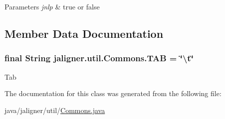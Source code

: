 \begin{DoxyParams}{Parameters}
{\em jnlp} & true or false \\
\hline
\end{DoxyParams}


\subsection{Member Data Documentation}
\hypertarget{classjaligner_1_1util_1_1_commons_a2df8b17be1dbabf911eddbe8a155e5eb}{
\subsubsection[{T\+A\+B}]{\setlength{\rightskip}{0pt plus 5cm}final String jaligner.\+util.\+Commons.\+T\+A\+B = \char`\"{}\textbackslash{}t\char`\"{}\hspace{0.3cm}{\ttfamily [static]}}}\label{classjaligner_1_1util_1_1_commons_a2df8b17be1dbabf911eddbe8a155e5eb}
Tab 

The documentation for this class was generated from the following file\+:\begin{DoxyCompactItemize}
\item 
java/jaligner/util/\hyperlink{_commons_8java}{Commons.\+java}\end{DoxyCompactItemize}
